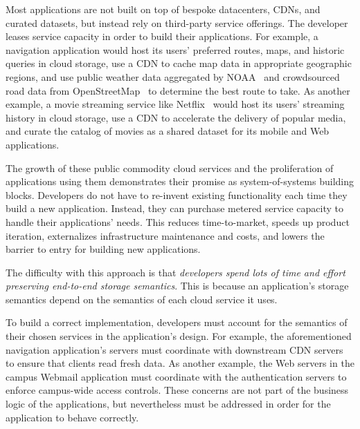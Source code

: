Most applications are not built on top of bespoke datacenters, CDNs, and curated
datasets, but instead rely on third-party service offerings.  The developer
leases service capacity in order to build their applications.
For example, a navigation application
would host its users' preferred routes, maps, and historic queries in cloud storage,
use a CDN to cache map data in appropriate geographic regions,
and use public weather data aggregated by NOAA~\cite{noaa} and crowdsourced road
data from OpenStreetMap~\cite{openstreetmap} to determine the best route to take.
As another example, a movie streaming service like Netflix~\cite{netflix} would
host its users' streaming history in cloud storage, use a CDN to accelerate the
delivery of popular media, and curate the catalog of movies as a shared dataset
for its mobile and Web applications.



The growth of these public commodity cloud services and the proliferation of
applications using them demonstrates their promise as system-of-systems
building blocks.  Developers do not have to re-invent existing functionality
each time they build a new application.  Instead, they can
purchase metered service capacity to handle their applications' needs.
This reduces time-to-market, speeds up product iteration, externalizes
infrastructure maintenance and costs,
and lowers the barrier to entry for building new applications.

The difficulty with this approach is that \emph{developers spend lots of
time and effort preserving end-to-end storage semantics}.  This is because an application's
storage semantics depend on the semantics of each cloud service it uses.

To build a correct implementation, developers must account for
the semantics of their chosen services in the application's design.
For example, the aforementioned navigation application's servers
must coordinate with downstream CDN servers to ensure that
clients read fresh data.  As another example, the Web servers in the
campus Webmail application must coordinate with 
the authentication servers to enforce campus-wide access controls.
These concerns are not part of the business logic of the applications, but 
nevertheless must be addressed in order for the application to behave correctly.

